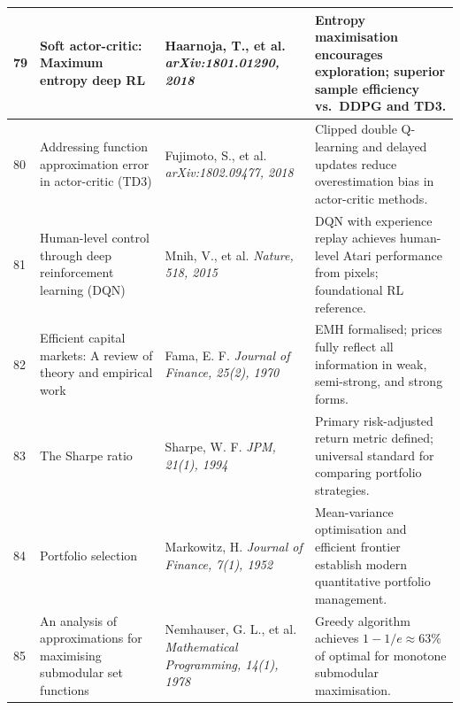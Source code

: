 \documentclass[12pt,a4paper,oneside]{report}
\theoremstyle{definition}
\theoremstyle{remark}
\begin{document}
\begin{center}
\begin{longtable}{|p{0.8cm}|p{4.2cm}|>{\raggedright\arraybackslash}p{4cm}|p{4.5cm}|}
79 & Soft actor-critic: Maximum entropy deep RL \cite{Haarnoja2018SAC} & Haarnoja, T., et al. \newline\newline \textit{arXiv:1801.01290, 2018} & Entropy maximisation encourages exploration; superior sample efficiency vs.\ DDPG and TD3. \\ \hline

80 & Addressing function approximation error in actor-critic (TD3) \cite{Fujimoto2018TD3} & Fujimoto, S., et al. \newline\newline \textit{arXiv:1802.09477, 2018} & Clipped double Q-learning and delayed updates reduce overestimation bias in actor-critic methods. \\ \hline



81 & Human-level control through deep reinforcement learning (DQN) \cite{Mnih2015DQN} & Mnih, V., et al. \newline\newline \textit{Nature, 518, 2015} & DQN with experience replay achieves human-level Atari performance from pixels; foundational RL reference. \\ \hline

82 & Efficient capital markets: A review of theory and empirical work \cite{Fama1970EMH} & Fama, E. F. \newline\newline \textit{Journal of Finance, 25(2), 1970} & EMH formalised; prices fully reflect all information in weak, semi-strong, and strong forms. \\ \hline

83 & The Sharpe ratio \cite{Sharpe1994Ratio} & Sharpe, W. F. \newline\newline \textit{JPM, 21(1), 1994} & Primary risk-adjusted return metric defined; universal standard for comparing portfolio strategies. \\ \hline

84 & Portfolio selection \cite{Markowitz1952Portfolio} & Markowitz, H. \newline\newline \textit{Journal of Finance, 7(1), 1952} & Mean-variance optimisation and efficient frontier establish modern quantitative portfolio management. \\ \hline

85 & An analysis of approximations for maximising submodular set functions \cite{Nemhauser1978Submodular} & Nemhauser, G. L., et al. \newline\newline \textit{Mathematical Programming, 14(1), 1978} & Greedy algorithm achieves $1-1/e \approx 63\%$ of optimal for monotone submodular maximisation. \\ \hline


\end{longtable}
\end{center}
\end{document}
